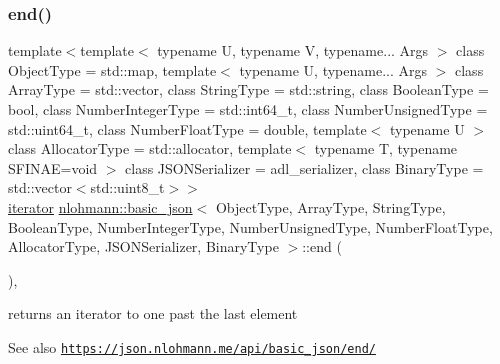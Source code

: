 \subsubsection{\texorpdfstring{end()}{end()}\hspace{0.1cm}{\footnotesize\ttfamily [1/2]}}
{\footnotesize\ttfamily template$<$template$<$ typename U, typename V, typename... Args $>$ class Object\+Type = std\+::map, template$<$ typename U, typename... Args $>$ class Array\+Type = std\+::vector, class String\+Type  = std\+::string, class Boolean\+Type  = bool, class Number\+Integer\+Type  = std\+::int64\+\_\+t, class Number\+Unsigned\+Type  = std\+::uint64\+\_\+t, class Number\+Float\+Type  = double, template$<$ typename U $>$ class Allocator\+Type = std\+::allocator, template$<$ typename T, typename S\+F\+I\+N\+A\+E=void $>$ class J\+S\+O\+N\+Serializer = adl\+\_\+serializer, class Binary\+Type  = std\+::vector$<$std\+::uint8\+\_\+t$>$$>$ \\
\hyperlink{classnlohmann_1_1basic__json_aa549b2b382916b3baafb526e5cb410bd}{iterator} \hyperlink{classnlohmann_1_1basic__json}{nlohmann\+::basic\+\_\+json}$<$ Object\+Type, Array\+Type, String\+Type, Boolean\+Type, Number\+Integer\+Type, Number\+Unsigned\+Type, Number\+Float\+Type, Allocator\+Type, J\+S\+O\+N\+Serializer, Binary\+Type $>$\+::end (\begin{DoxyParamCaption}{ }\end{DoxyParamCaption})\hspace{0.3cm}{\ttfamily [inline]}, {\ttfamily [noexcept]}}



returns an iterator to one past the last element 

\begin{DoxySeeAlso}{See also}
\href{https://json.nlohmann.me/api/basic_json/end/}{\tt https\+://json.\+nlohmann.\+me/api/basic\+\_\+json/end/} 
\end{DoxySeeAlso}
\mbox{\label{classnlohmann_1_1basic__json_a82b5b96f86879a3bac0c713d33178551}} 
